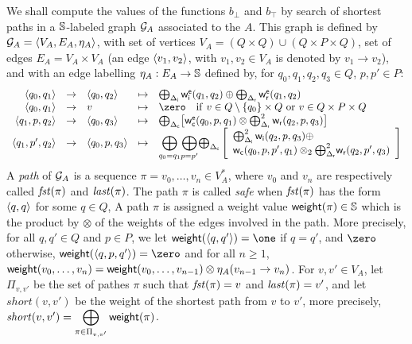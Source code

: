 %

We shall compute the values of the functions $b_\bot$ and $b_\top$
by search of shortest paths in a $\mathbb{S}$-labeled graph $\mathcal{G}_A$
associated to the \SWVPA $A$. 
This graph is defined by $\G_A = \< V_A, E_A, \eta_A >$, 
with set of vertices $V_A = (Q \times Q) \cup (Q \times P \times Q)$,
set of edges $E_A = V_A \times V_A$
(an edge $\< v_1, v_2>$, with $v_1, v_2 \in V_A$ is denoted by $v_1 \to v_2$),
and with an edge labelling  
$\eta_A : E_A \to \mathbb{S}$ defined by, %
for $q_0, q_1, q_2, q_3 \in Q$, $p, p' \in P$:
%
\[
\begin{array}{rclcl}
%
\< q_0, q_1> & \to & \< q_0, q_2> & \mapsto &
\bigoplus_{\Deltai} \weiei(q_1, q_2) \oplus \bigoplus_{\Deltar} \weier(q_1, q_2)\\
%
\< q_0, q_1> & \to & v & \mapsto & \zero 
\quad \mathrm{if}\ v \in Q\setminus \{ q_0 \} \times Q\  \mathrm{or}\  v \in Q \times P \times Q\\
%
\< q_1, p, q_2> & \to & \<q_0, q_3> & \mapsto &
\bigoplus_{\Deltac} \bigl[ \weiec(q_0, p, q_1) \otimes \bigoplus^2_{\Deltar} \weir(q_2, p, q_3)\bigr]\\ 
%
%
\< q_1, p', q_2> & \to & \< q_0, p, q_3> & \mapsto &
{\displaystyle\bigoplus_{q_0=q_1}}
{\displaystyle\bigoplus_{p=p'}}
{\bigoplus_{\Deltac}}
 \left[
 \begin{array}{l}
 \bigoplus^2_{\Deltai} \weii(q_2, p, q_3) \oplus\\
 \weic(q_0, p, p', q_1) \otimes_2 {\bigoplus^2_{\Deltar}} \weir(q_2, p', q_3) 
 \end{array}
 \right]
%
\end{array}
\]
%
A \emph{path} of $\mathcal{G}_A$ is a sequence $\pi = v_0,\ldots, v_n \in V^*_A$,
where $v_0$ and $v_n$ are respectively called $\mathit{fst}(\pi)$ and $\mathit{last}(\pi)$.
The path $\pi$ is called \emph{safe} when $\mathit{fst}(\pi)$ has the form $\< q, q>$ for some $q \in Q$, 
%
A path $\pi$ is assigned a weight value $\mathsf{weight}(\pi) \in \mathbb{S}$ which is the product by $\otimes$ 
of the weights of the edges involved in the path.
More precisely, for all $q, q' \in Q$ and $p \in P$, we let 
$\weight(\< q, q' > ) = \one$ if $q = q'$, and $\zero$ otherwise, 
$\weight(\< q, p, q' > ) = \zero$ and 
for all $n \geq 1$, 
$\mathsf{weight}(v_0,\ldots, v_n) = \mathsf{weight}(v_0,\ldots, v_{n-1}) \otimes \eta_A(v_{n-1} \to v_{n})$.
%
For $v, v' \in V_A$,
let $\Pi_{v, v'}$ be the set of pathes $\pi$ such that 
$\mathit{fst}(\pi) = v$ and $\mathit{last}(\pi) = v'$, 
and let $\mathit{short}(v, v')$ be the weight of the shortest path from $v$ to $v'$, 
more precisely, 
\(\mathit{short}(v, v') = \displaystyle\bigoplus_{\pi\in \Pi_{v, v'}} \mathsf{weight}(\pi)\).

